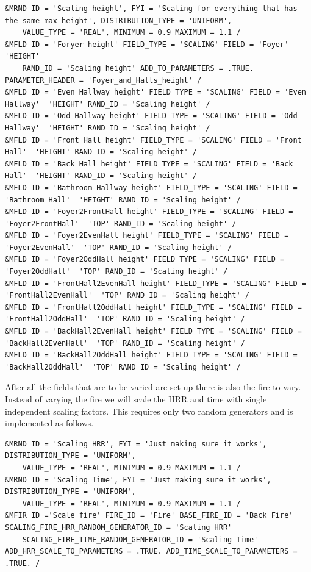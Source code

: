\documentclass[12pt,twoside]{book}
\begin{document}
\vspace{\baselineskip}
\begin{lstlisting}
&MRND ID = 'Scaling height', FYI = 'Scaling for everything that has the same max height', DISTRIBUTION_TYPE = 'UNIFORM',
    VALUE_TYPE = 'REAL', MINIMUM = 0.9 MAXIMUM = 1.1 /
&MFLD ID = 'Foryer height' FIELD_TYPE = 'SCALING' FIELD = 'Foyer'  'HEIGHT'
    RAND_ID = 'Scaling height' ADD_TO_PARAMETERS = .TRUE. PARAMETER_HEADER = 'Foyer_and_Halls_height' /
&MFLD ID = 'Even Hallway height' FIELD_TYPE = 'SCALING' FIELD = 'Even Hallway'  'HEIGHT' RAND_ID = 'Scaling height' /
&MFLD ID = 'Odd Hallway height' FIELD_TYPE = 'SCALING' FIELD = 'Odd Hallway'  'HEIGHT' RAND_ID = 'Scaling height' /
&MFLD ID = 'Front Hall height' FIELD_TYPE = 'SCALING' FIELD = 'Front Hall'  'HEIGHT' RAND_ID = 'Scaling height' /
&MFLD ID = 'Back Hall height' FIELD_TYPE = 'SCALING' FIELD = 'Back Hall'  'HEIGHT' RAND_ID = 'Scaling height' /
&MFLD ID = 'Bathroom Hallway height' FIELD_TYPE = 'SCALING' FIELD = 'Bathroom Hall'  'HEIGHT' RAND_ID = 'Scaling height' /
&MFLD ID = 'Foyer2FrontHall height' FIELD_TYPE = 'SCALING' FIELD = 'Foyer2FrontHall'  'TOP' RAND_ID = 'Scaling height' /
&MFLD ID = 'Foyer2EvenHall height' FIELD_TYPE = 'SCALING' FIELD = 'Foyer2EvenHall'  'TOP' RAND_ID = 'Scaling height' /
&MFLD ID = 'Foyer2OddHall height' FIELD_TYPE = 'SCALING' FIELD = 'Foyer2OddHall'  'TOP' RAND_ID = 'Scaling height' /
&MFLD ID = 'FrontHall2EvenHall height' FIELD_TYPE = 'SCALING' FIELD = 'FrontHall2EvenHall'  'TOP' RAND_ID = 'Scaling height' /
&MFLD ID = 'FrontHall2OddHall height' FIELD_TYPE = 'SCALING' FIELD = 'FrontHall2OddHall'  'TOP' RAND_ID = 'Scaling height' /
&MFLD ID = 'BackHall2EvenHall height' FIELD_TYPE = 'SCALING' FIELD = 'BackHall2EvenHall'  'TOP' RAND_ID = 'Scaling height' /
&MFLD ID = 'BackHall2OddHall height' FIELD_TYPE = 'SCALING' FIELD = 'BackHall2OddHall'  'TOP' RAND_ID = 'Scaling height' /
\end{lstlisting}

After all the fields that are to be varied are set up there is also the fire to vary. Instead of varying the fire we will scale the HRR and time with single independent scaling factors. This requires only two random generators and is implemented as follows.

\vspace{\baselineskip}
\begin{lstlisting}
&MRND ID = 'Scaling HRR', FYI = 'Just making sure it works', DISTRIBUTION_TYPE = 'UNIFORM',
    VALUE_TYPE = 'REAL', MINIMUM = 0.9 MAXIMUM = 1.1 /
&MRND ID = 'Scaling Time', FYI = 'Just making sure it works', DISTRIBUTION_TYPE = 'UNIFORM',
    VALUE_TYPE = 'REAL', MINIMUM = 0.9 MAXIMUM = 1.1 /
&MFIR ID ='Scale fire' FIRE_ID = 'Fire' BASE_FIRE_ID = 'Back Fire' SCALING_FIRE_HRR_RANDOM_GENERATOR_ID = 'Scaling HRR'
    SCALING_FIRE_TIME_RANDOM_GENERATOR_ID = 'Scaling Time' ADD_HRR_SCALE_TO_PARAMETERS = .TRUE. ADD_TIME_SCALE_TO_PARAMETERS = .TRUE. /
\end{lstlisting}
\end{document}
